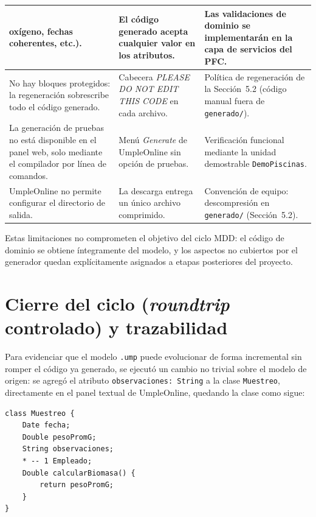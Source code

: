 \documentclass[11pt,a4paper]{article}
\begin{document}
\begin{table}[H]
\begin{tabular}{|p{4.2cm}|p{4.6cm}|p{4.6cm}|}
    oxígeno, fechas coherentes, etc.). &
    El código generado acepta cualquier valor en los atributos. &
    Las validaciones de dominio se implementarán en la capa de
    servicios del PFC. \\
    \hline
    No hay bloques protegidos: la regeneración sobrescribe todo el
    código generado. &
    Cabecera \emph{PLEASE DO NOT EDIT THIS CODE} en cada archivo. &
    Política de regeneración de la Sección~5.2 (código manual fuera
    de \texttt{generado/}). \\
    \hline
    La generación de pruebas no está disponible en el panel web,
    solo mediante el compilador por línea de comandos. &
    Menú \emph{Generate} de UmpleOnline sin opción de pruebas. &
    Verificación funcional mediante la unidad demostrable
    \texttt{DemoPiscinas}. \\
    \hline
    UmpleOnline no permite configurar el directorio de salida. &
    La descarga entrega un único archivo comprimido. &
    Convención de equipo: descompresión en \texttt{generado/}
    (Sección~5.2). \\
    \hline
  \end{tabular}
\end{table}

Estas limitaciones no comprometen el objetivo del ciclo MDD: el
código de dominio se obtiene íntegramente del modelo, y los aspectos
no cubiertos por el generador quedan explícitamente asignados a
etapas posteriores del proyecto.


\section{Cierre del ciclo (\emph{roundtrip} controlado) y trazabilidad}
\label{sec:roundtrip}

Para evidenciar que el modelo \texttt{.ump} puede evolucionar de forma incremental sin romper el código ya generado, se ejecutó un cambio no trivial sobre el modelo de origen: se agregó el atributo \texttt{observaciones: String} a la clase \texttt{Muestreo}, directamente en el panel textual de UmpleOnline, quedando la clase como sigue:

\begin{verbatim}
class Muestreo {
    Date fecha;
    Double pesoPromG;
    String observaciones;
    * -- 1 Empleado;
    Double calcularBiomasa() {
        return pesoPromG;
    }
}
\end{verbatim}
\end{document}
